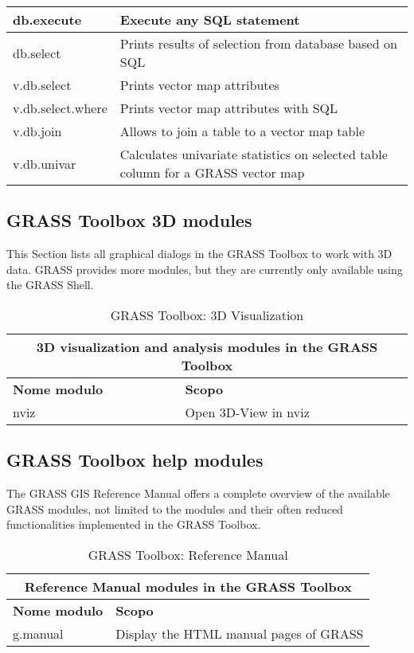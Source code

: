 \begin{table}[ht]
\begin{tabular}{|p{4cm}|p{12cm}|}
  \hline db.execute & Execute any SQL statement \\
  \hline db.select & Prints results of selection from database based on SQL \\
  \hline v.db.select & Prints vector map attributes \\
  \hline v.db.select.where & Prints vector map attributes with SQL \\
  \hline v.db.join & Allows to join a table to a vector map table \\
  \hline v.db.univar & Calculates univariate statistics on selected table
  column for a GRASS vector map \\
\hline
\end{tabular}
\end{table}

\clearpage

\subsection{GRASS Toolbox 3D modules}

This Section lists all graphical dialogs in the GRASS Toolbox to work with 3D 
data. GRASS provides more modules, but they are currently only available using 
the GRASS Shell.

\begin{table}[ht]
\centering
\caption{GRASS Toolbox: 3D Visualization}\medskip
 \begin{tabular}{|p{4cm}|p{12cm}|}
  \hline \multicolumn{2}{|c|}{\textbf{3D visualization and analysis modules in the GRASS
  Toolbox}} \\
  \hline \textbf{Nome modulo} & \textbf{Scopo} \\
  \hline nviz & Open 3D-View in nviz\\
\hline
\end{tabular}
\end{table}

\subsection{GRASS Toolbox help modules}

The GRASS GIS Reference Manual offers a complete overview of the available 
GRASS modules, not limited to the modules and their often reduced functionalities 
implemented in the GRASS Toolbox. 

\begin{table}[ht]
\centering
\caption{GRASS Toolbox: Reference Manual}\medskip
 \begin{tabular}{|p{4cm}|p{12cm}|}
  \hline \multicolumn{2}{|c|}{\textbf{Reference Manual modules in the GRASS
  Toolbox}} \\
  \hline \textbf{Nome modulo} & \textbf{Scopo} \\
  \hline g.manual & Display the HTML manual pages of GRASS \\
\hline
\end{tabular}
\end{table}




